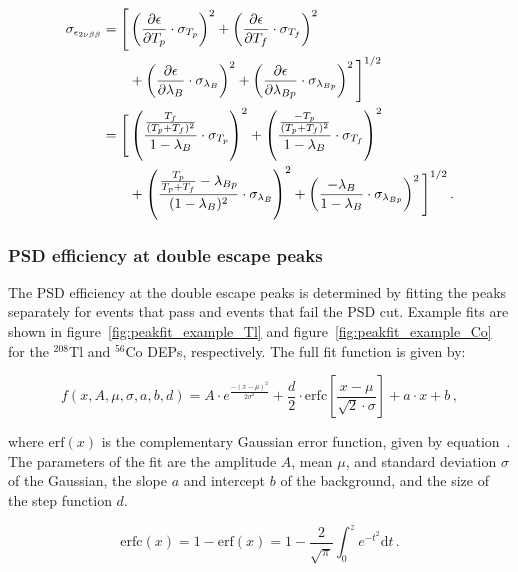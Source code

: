 \begin{align}
\sigma_{\epsilon_{2 \nu \beta \beta}} = \Bigg[ &
\left( \frac{\partial \epsilon}{\partial T_p} \cdot \sigma_{T_p} \right)^2
+ \left( \frac{\partial \epsilon}{\partial T_f} \cdot \sigma_{T_f} \right)^2 \notag \\
& + \left( \frac{\partial \epsilon}{\partial \lambda_B} \cdot \sigma_{\lambda_B} \right)^2
+ \left( \frac{\partial \epsilon}{\partial \lambda_{Bp}} \cdot \sigma_{\lambda_{Bp}} \right)^2
\Bigg]^{1/2} \notag \\
= \Bigg[ &
\left( \frac{\frac{T_f}{(T_p + T_f)^2}}{1 - \lambda_B} \cdot \sigma_{T_p} \right)^2 
+ \left( \frac{\frac{-T_p}{(T_p + T_f)^2}}{1 - \lambda_B} \cdot \sigma_{T_f} \right)^2 \notag \\
& + \left( \frac{\frac{T_p}{T_p + T_f} - \lambda_{Bp}}{(1 - \lambda_B)^2} \cdot \sigma_{\lambda_B} \right)^2
+ \left( \frac{-\lambda_B}{1 - \lambda_B} \cdot \sigma_{\lambda_{Bp}} \right)^2 \Bigg]^{1/2}
\label{eff_2vbb_err} \,.
\end{align}


\subsubsection{PSD efficiency at double escape peaks}

The PSD efficiency at the double escape peaks is determined by fitting the peaks separately for events that pass and events that fail the PSD cut. Example fits are shown in figure~\ref{fig:peakfit_example_Tl} and figure~\ref{fig:peakfit_example_Co} for the $^{208}$Tl and $^{56}$Co DEPs, respectively.  
The full fit function is given by:

\begin{equation}
\label{eq:fit_function_gauss_lin_step}
    f(x, A, \mu, \sigma, a, b, d) = A \cdot e^{\frac{-(x - \mu)^2}{2 \sigma^2}} + \frac{d}{2} \cdot \mathrm{erfc} \left[ \frac{x - \mu}{\sqrt{2} \cdot \sigma} \right] + a \cdot x + b \,,
\end{equation}

\noindent where $\mathrm{erf}(x)$ is the complementary Gaussian error function, given by equation~. The parameters of the fit are the amplitude $A$, mean $\mu$, and standard deviation $\sigma$ of the Gaussian, the slope $a$ and intercept $b$ of the background, and the size of the step function $d$.   

\begin{equation}
\label{eq:erfc}
    \mathrm{erfc}(x) = 1 - \mathrm{erf}(x) = 1 - \frac{2}{\sqrt{\pi}} \int_0^z e^{-t^2} \mathrm{d}t \,.
\end{equation}


